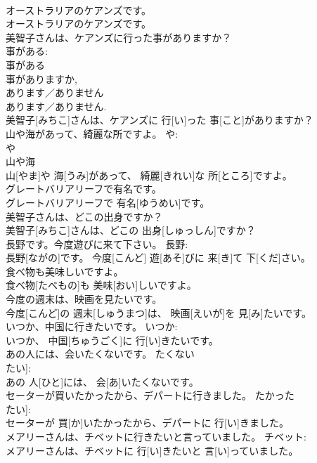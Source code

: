 \documentclass[8pt]{extreport}
\begin{document}
\begin{CJK}{UTF8}{min}
\\	オーストラリアのケアンズです。	
\\	オーストラリアのケアンズです。	
\\	美智子さんは、ケアンズに行った事がありますか？	
\\	事がある: 
\\	事がある 
\\	事がありますか, 
\\	あります／ありません 
\\	あります／ありません.
\\	美智子[みちこ]さんは、ケアンズに 行[い]った 事[こと]がありますか？	
\\	山や海があって、綺麗な所ですよ。	や: 
\\	や 
\\	山や海 
\\	山[やま]や 海[うみ]があって、 綺麗[きれい]な 所[ところ]ですよ。	
\\	グレートバリアリーフで有名です。	
\\	グレートバリアリーフで 有名[ゆうめい]です。	
\\	美智子さんは、どこの出身ですか？	
\\	美智子[みちこ]さんは、どこの 出身[しゅっしん]ですか？	
\\	長野です。今度遊びに来て下さい。	長野: 
\\	長野[ながの]です。 今度[こんど] 遊[あそ]びに 来[き]て 下[くだ]さい。	
\\	食べ物も美味しいですよ。	
\\	食べ物[たべもの]も 美味[おい]しいですよ。	
\\	今度の週末は、映画を見たいです。	
\\	今度[こんど]の 週末[しゅうまつ]は、 映画[えいが]を 見[み]たいです。	
\\	いつか、中国に行きたいです。	いつか: 
\\	いつか、 中国[ちゅうごく]に 行[い]きたいです。	
\\	あの人には、会いたくないです。	たくない 
\\	たい]: 
\\	あの 人[ひと]には、 会[あ]いたくないです。	
\\	セーターが買いたかったから、デパートに行きました。	たかった 
\\	たい]: 
\\	セーターが 買[か]いたかったから、デパートに 行[い]きました。	
\\	メアリーさんは、チベットに行きたいと言っていました。	チベット: 
\\	メアリーさんは、チベットに 行[い]きたいと 言[い]っていました。	

\end{CJK}
\end{document}
